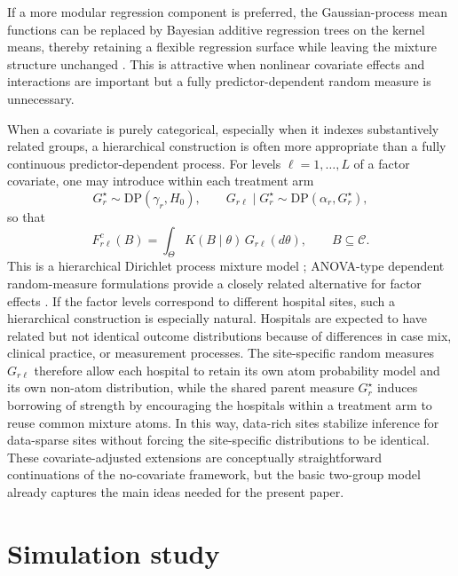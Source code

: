 \documentclass[11pt]{article}
\begin{document}
If a more modular regression component is preferred, the Gaussian-process mean functions can be replaced by Bayesian additive regression trees on the kernel means, thereby retaining a flexible regression surface while leaving the mixture structure unchanged \citep{chipman2010bart}. This is attractive when nonlinear covariate effects and interactions are important but a fully predictor-dependent random measure is unnecessary.

When a covariate is purely categorical, especially when it indexes substantively related groups, a hierarchical construction is often more appropriate than a fully continuous predictor-dependent process. For levels $\ell = 1,\ldots,L$ of a factor covariate, one may introduce within each treatment arm
\[
  G_r^\star \sim \mathrm{DP}(\gamma_r,H_0),
  \qquad
  G_{r\ell} \mid G_r^\star \sim \mathrm{DP}(\alpha_r,G_r^\star),
\]
so that
\[
  F_{r\ell}^c(B)
  =
  \int_{\Theta} K(B \mid \theta)\,G_{r\ell}(d\theta),
  \qquad
  B \subseteq \mathcal{C}.
\]
This is a hierarchical Dirichlet process mixture model \citep{teh2006hierarchical}; ANOVA-type dependent random-measure formulations provide a closely related alternative for factor effects \citep{deiorio2004anova}. If the factor levels correspond to different hospital sites, such a hierarchical construction is especially natural. Hospitals are expected to have related but not identical outcome distributions because of differences in case mix, clinical practice, or measurement processes. The site-specific random measures $G_{r\ell}$ therefore allow each hospital to retain its own atom probability model and its own non-atom distribution, while the shared parent measure $G_r^\star$ induces borrowing of strength by encouraging the hospitals within a treatment arm to reuse common mixture atoms. In this way, data-rich sites stabilize inference for data-sparse sites without forcing the site-specific distributions to be identical. These covariate-adjusted extensions are conceptually straightforward continuations of the no-covariate framework, but the basic two-group model already captures the main ideas needed for the present paper.








\section{Simulation study}\label{sec:simulation-study}
\end{document}
